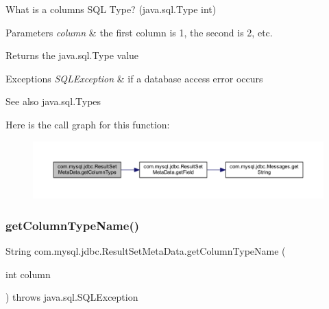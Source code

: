 What is a column\textquotesingle{}s S\+QL Type? (java.\+sql.\+Type int)


\begin{DoxyParams}{Parameters}
{\em column} & the first column is 1, the second is 2, etc.\\
\hline
\end{DoxyParams}
\begin{DoxyReturn}{Returns}
the java.\+sql.\+Type value
\end{DoxyReturn}

\begin{DoxyExceptions}{Exceptions}
{\em S\+Q\+L\+Exception} & if a database access error occurs\\
\hline
\end{DoxyExceptions}
\begin{DoxySeeAlso}{See also}
java.\+sql.\+Types 
\end{DoxySeeAlso}
Here is the call graph for this function\+:
\nopagebreak
\begin{figure}[H]
\begin{center}
\leavevmode
\includegraphics[width=350pt]{classcom_1_1mysql_1_1jdbc_1_1_result_set_meta_data_a02c543ac124aef56d0266da247510a91_cgraph}
\end{center}
\end{figure}
\mbox{\label{classcom_1_1mysql_1_1jdbc_1_1_result_set_meta_data_a05b1032063c16ac751c62342fdaee172}} 
\subsubsection{\texorpdfstring{get\+Column\+Type\+Name()}{getColumnTypeName()}}
{\footnotesize\ttfamily String com.\+mysql.\+jdbc.\+Result\+Set\+Meta\+Data.\+get\+Column\+Type\+Name (\begin{DoxyParamCaption}\item[{int}]{column }\end{DoxyParamCaption}) throws java.\+sql.\+S\+Q\+L\+Exception}

